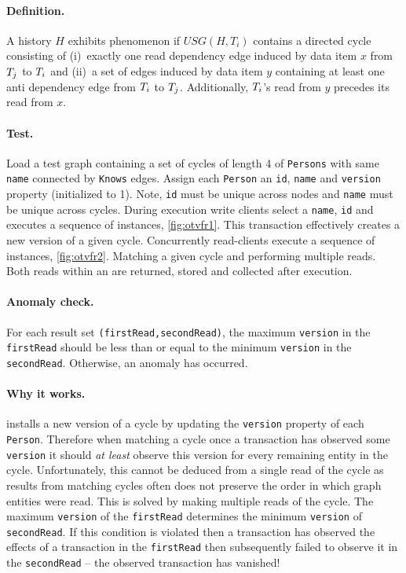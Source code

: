 \paragraph{Definition.}
A history $H$ exhibits phenomenon  if $\textit{USG}(H,T_i)$ contains a directed cycle consisting of
(i)~exactly one read dependency edge induced by data item $x$ from $T_j$ to $T_i$ and
(ii)~a set of edges induced by data item $y$ containing at least one anti dependency edge from $T_i$ to $T_j$.
Additionally, $T_i$'s read from $y$ precedes its read from $x$.

\paragraph{Test.}
Load a test graph containing a set of cycles of length 4 of \texttt{Persons} with same \texttt{name} connected by \texttt{Knows} edges.
Assign each \texttt{Person} an \texttt{id}, \texttt{name} and \texttt{version} property (initialized to 1).
Note, \texttt{id} must be unique across nodes and \texttt{name} must be unique across cycles.
During execution write clients select a \texttt{name}, \texttt{id} and executes a sequence of  instances, \autoref{fig:otvfr1}.
This transaction effectively creates a new version of a given cycle.
Concurrently read-clients execute a sequence of  instances, \autoref{fig:otvfr2}.
Matching a given cycle and performing multiple reads.
Both reads within an  are returned, stored and collected after execution.

\paragraph{Anomaly check.}
For each  result set \texttt{(firstRead,secondRead)}, the maximum \texttt{version} in the \texttt{firstRead} should be less than or equal to the minimum \texttt{version} in the \texttt{secondRead}.
Otherwise, an  anomaly has occurred.

\paragraph{Why it works.}
 installs a new version of a cycle by updating the \texttt{version} property of each \texttt{Person}.
Therefore when matching a cycle once a transaction has observed some \texttt{version} it should \emph{at least} observe this version for every remaining entity in the cycle.
Unfortunately, this cannot be deduced from a single read of the cycle as results from matching cycles often does not preserve the order in which graph entities were read.
This is solved by making multiple reads of the cycle.
The maximum \texttt{version} of the \texttt{firstRead} determines the minimum \texttt{version} of \texttt{secondRead}.
If this condition is violated then a transaction has observed the effects of a transaction in the \texttt{firstRead} then subsequently failed to observe it in the \texttt{secondRead} -- the observed transaction has vanished!

